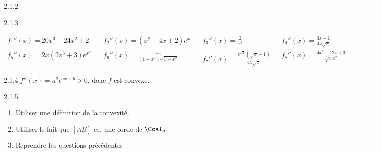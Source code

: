 \begin{Solution}{2.1.2}
\begin{minipage}{0.45\linewidth}
	
\end{minipage}\hfill
\begin{minipage}{0.45\linewidth}
	
\end{minipage}
\vspace{10pt}
\end{Solution}
\begin{Solution}{2.1.3}
	\begin{tabular}{p{0.23\linewidth}p{0.23\linewidth}p{0.18\linewidth}p{0.25\linewidth}}
		$f_1''(x)=20x^3-24x^2+2$ & $f_2''(x)=(x^2+4x+2)e^x$ & $f_3''(x)=\frac{2}{x^3}$ & $f_4''(x)=\frac{3x-1}{4x\sqrt{x}}$\\
		$f_5''(x)=2x(2x^3+3)e^{x^2}$ & $f_6''(x)=\frac{-1}{(1-x^2)\sqrt{1-x^2}}$ & $f_7''(x)=\frac{e^{\sqrt{x}}(\sqrt{x}-1)}{4x\sqrt{x}}$ & $f_8''(x)=\frac{4x^2-12x+3}{\sqrt{x}e^x}$
	\end{tabular}
\end{Solution}
\begin{Solution}{2.1.4}
	$f''(x)=a^2e^{ax+b} > 0$, donc $f$ est convexe.\\
\end{Solution}
\begin{Indication}{2.1.5}
	\begin{enumerate}
		\item Utiliser une définition de la convexité.
		\item Utiliser le fait que $[AB]$ est une corde de $\Ccal_g$
		\item[4.] Reprendre les questions précédentes
	\end{enumerate}
\end{Indication}
